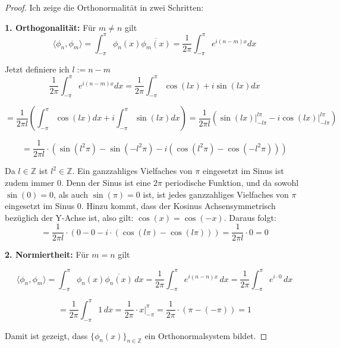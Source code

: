 \documentclass[a4paper,12pt]{article}
\theoremstyle{definition}
\theoremstyle{remark}
\begin{document}
      \begin{proof}
        Ich zeige die Orthonormalität in zwei Schritten: 
            
        \textbf{1. Orthogonalität:}  
        Für $m \neq n$ gilt
        $$\langle \phi_n, \phi_m \rangle = \int_{-\pi}^{\pi}{\phi_n(x) \overline{\phi_m(x)}} = \frac{1}{2\pi}\int_{-\pi}^\pi{e^{i(n-m)x}dx}$$
        
        Jetzt definiere ich $l := n-m$
        \[\frac{1}{2\pi}\int_{-\pi}^\pi{e^{i(n-m)x}dx} = \frac{1}{2\pi}\int_{-\pi}^\pi{\cos(lx) + i \sin (lx)} dx\] 
        
        \[= \frac{1}{2\pi l}\left(\int_{-\pi}^\pi{\cos (lx) dx} + i\int_{-\pi}^\pi{ \sin (lx) dx} \right)  = \frac{1}{2\pi l} \left(\sin(lx)\big|_{-l\pi}^{l\pi} - i\cos(lx)\big|_{-l\pi}^{l\pi} \right)\]
        
        \[= \frac{1}{2\pi l} \cdot \left(\sin(l^2\pi) - \sin(-l^2\pi) - i\left(\cos(l^2\pi) - \cos(-l^2\pi)\right)\right) \]
        
        Da $l\in \mathbb{Z}$ ist $l^2 \in \mathbb{Z}$. Ein ganzzahliges Vielfaches von $\pi$
        eingesetzt im Sinus ist zudem immer 0. Denn der Sinus ist eine $2\pi$ periodische Funktion, und da
        sowohl $\sin(0) = 0$, als auch $\sin (\pi) = 0$ ist, ist jedes ganzzahliges Vielfaches von $\pi$ eingesetzt 
        im Sinus 0. Hinzu kommt, dass der Kosinus Achsensymmetrisch bezüglich der Y-Achse ist, also gilt:
        $\cos (x) =  \cos (-x)$. Daraus folgt:
        \[= \frac{1}{2\pi l} \cdot (0 - 0 - i\cdot(\cos(l\pi) - \cos(l\pi))) = \frac{1}{2\pi l} \cdot 0 = 0\]
        
        
        \textbf{2. Normiertheit:}  
        Für $m = n$ gilt
        
        \[\langle \phi_n, \phi_m \rangle = \int_{-\pi}^{\pi} \phi_n(x) \overline{\phi_n(x)} \, dx = \frac{1}{2\pi} \int_{-\pi}^{\pi} e^{i(n -n) x}\, dx = \frac{1}{2\pi} \int_{-\pi}^{\pi} e^{i\cdot0} \, dx\]
        
        \[= \frac{1}{2\pi} \int_{-\pi}^{\pi} 1 \, dx = \frac{1}{2\pi} \cdot x \Big|_{-\pi}^{\pi} = \frac{1}{2\pi} \cdot (\pi-(-\pi)) = 1\]
        
        Damit ist gezeigt, dass $\{\phi_n(x)\}_{n\in\mathbb{Z}}$ ein Orthonormalsystem bildet.
      \end{proof}
\end{document}
